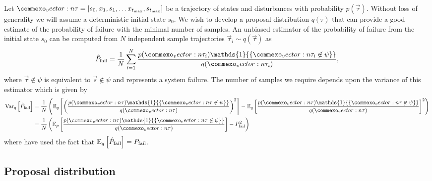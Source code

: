 Let $\vec{\tau} = [s_0, x_1, s_1, \ldots x_{t_{\rm max}}, s_{t_{\rm max}}]$ be a trajectory of states and disturbances with probability $p(\vec{\tau})$. Without loss of generality we will assume a deterministic initial state $s_0$.  We wish to develop a proposal distribution $q(\tau)$ that can provide a good estimate of the probability of failure with the minimal number of samples. An unbiased estimator of the probability of failure from the initial state $s_0$ can be computed from $N$ independent sample trajectories $\vec{\tau}_i \sim q(\vec{\tau})$ as
\begin{equation}
\hat{P}_{\rm fail} = \frac{1}{N} \sum_{i=1}^N \frac{p(\vec{\tau}_i) \mathds{1}{\{ \vec{\tau}_i \not \in \psi \}}}{q(\vec{\tau}_i)} \text{,} \label{eq:pfail_estimator}
\end{equation}
where $\vec{\tau} \not \in \psi$ is equivalent to $\vec{s} \not \in \psi$ and represents a system failure. The number of samples we require depends upon the variance of this estimator which is given by
\begin{align}
\text{Var}_q\left[ \hat{P}_{\rm fail} \right] &= \frac{1}{N} \left( \mathbb{E}_q \left[\left(\frac{p(\vec{\tau}) \mathds{1}{\{ \vec{\tau} \not \in \psi \}}}{q(\vec{\tau})} \right)^2 \right] - \mathbb{E}_q\left[ \frac{p(\vec{\tau}) \mathds{1}{\{ \vec{\tau} \not \in \psi \}}}{q(\vec{\tau})}  \right]^2 \right) \\
&= \frac{1}{N} \left(\mathbb{E}_p \left[\frac{p(\vec{\tau}) \mathds{1}{\{ \vec{\tau} \not \in \psi \}}}{q(\vec{\tau})} \right] - P_{\rm fail}^2 \right)\label{eq:pfail_variance}
\end{align}
where have used the fact that $\mathbb{E}_q\left[ \hat{P}_{\rm fail}  \right] = P_{\rm fail}$. 

\subsection{Proposal distribution}

